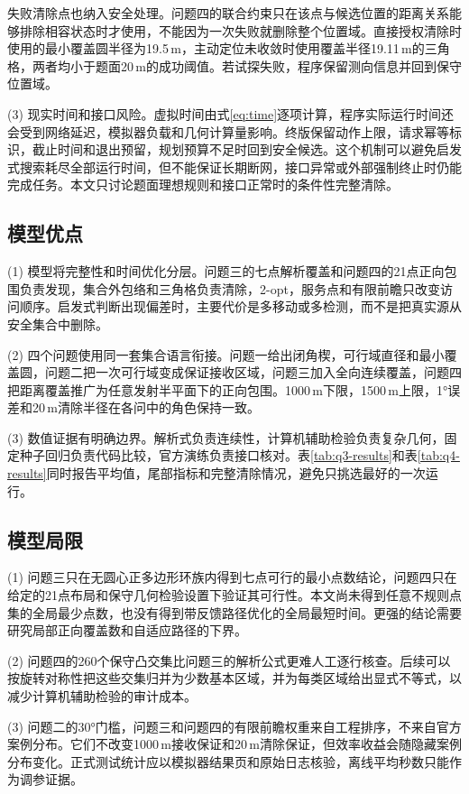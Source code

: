 \documentclass[UTF8,12pt,a4paper]{ctexart}
\numberwithin{equation}{section}
\begin{document}
失败清除点也纳入安全处理。问题四的联合约束只在该点与候选位置的距离关系能够排除相容状态时才使用，不能因为一次失败就删除整个位置域。直接授权清除时使用的最小覆盖圆半径为19.5\,m，主动定位未收敛时使用覆盖半径19.11\,m的三角格，两者均小于题面20\,m的成功阈值。若试探失败，程序保留测向信息并回到保守位置域。

(3) 现实时间和接口风险。虚拟时间由式\eqref{eq:time}逐项计算，程序实际运行时间还会受到网络延迟，模拟器负载和几何计算量影响。终版保留动作上限，请求幂等标识，截止时间和退出预留，规划预算不足时回到安全候选。这个机制可以避免启发式搜索耗尽全部运行时间，但不能保证长期断网，接口异常或外部强制终止时仍能完成任务。本文只讨论题面理想规则和接口正常时的条件性完整清除。

\subsection{模型优点}

(1) 模型将完整性和时间优化分层。问题三的七点解析覆盖和问题四的21点正向包围负责发现，集合外包络和三角格负责清除，2-opt，服务点和有限前瞻只改变访问顺序。启发式判断出现偏差时，主要代价是多移动或多检测，而不是把真实源从安全集合中删除。

(2) 四个问题使用同一套集合语言衔接。问题一给出闭角楔，可行域直径和最小覆盖圆，问题二把一次可行域变成保证接收区域，问题三加入全向连续覆盖，问题四把距离覆盖推广为任意发射半平面下的正向包围。1000\,m下限，1500\,m上限，1°误差和20\,m清除半径在各问中的角色保持一致。

(3) 数值证据有明确边界。解析式负责连续性，计算机辅助检验负责复杂几何，固定种子回归负责代码比较，官方演练负责接口核对。表\ref{tab:q3-results}和表\ref{tab:q4-results}同时报告平均值，尾部指标和完整清除情况，避免只挑选最好的一次运行。

\subsection{模型局限}

(1) 问题三只在无圆心正多边形环族内得到七点可行的最小点数结论，问题四只在给定的21点布局和保守几何检验设置下验证其可行性。本文尚未得到任意不规则点集的全局最少点数，也没有得到带反馈路径优化的全局最短时间。更强的结论需要研究局部正向覆盖数和自适应路径的下界。

(2) 问题四的260个保守凸交集比问题三的解析公式更难人工逐行核查。后续可以按旋转对称性把这些交集归并为少数基本区域，并为每类区域给出显式不等式，以减少计算机辅助检验的审计成本。

(3) 问题二的30°门槛，问题三和问题四的有限前瞻权重来自工程排序，不来自官方案例分布。它们不改变1000\,m接收保证和20\,m清除保证，但效率收益会随隐藏案例分布变化。正式测试统计应以模拟器结果页和原始日志核验，离线平均秒数只能作为调参证据。
\end{document}
